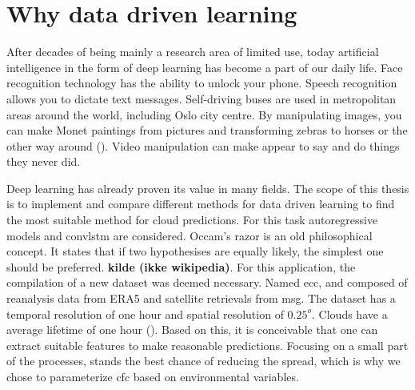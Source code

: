 

\section{Why data driven learning} \label{sec:intro_deep_learning}
After decades of being mainly a research area of limited use, today artificial intelligence in the form of deep learning has become a part of our daily life. Face recognition technology has the ability to unlock your phone. Speech recognition allows you to dictate text messages. Self-driving buses are used in metropolitan areas around the world, including Oslo city centre. By manipulating images, you can make Monet paintings from pictures and transforming zebras to horses or the other way around (\cite{zhu2017_cycleGAN_monet_zebra}). Video manipulation can make appear to say and do things they never did. 

Deep learning has already proven its value in many fields. The scope of this thesis is to implement and compare different methods for data driven learning to find the most suitable method for cloud predictions. For this task autoregressive models and \acrfull{convlstm} are considered. 
Occam's razor is an old philosophical concept. It states that if two hypothesises are equally likely, the simplest one should be preferred. \textbf{kilde (ikke wikipedia)}. For this application, the compilation of a new dataset was deemed necessary. Named \acrfull{ecc}, and composed of reanalysis data from ERA5 and satellite retrievals from \acrfull{msg}. The dataset has a temporal resolution of one hour and spatial resolution of $0.25^o$. Clouds have a average lifetime of one hour (\cite{lohmann2016}). Based on this, it is conceivable that one can extract suitable features to make reasonable predictions. Focusing on a small part of the processes, stands the best chance of reducing the spread, which is why we chose to parameterize \acrfull{cfc} based on environmental variables.

